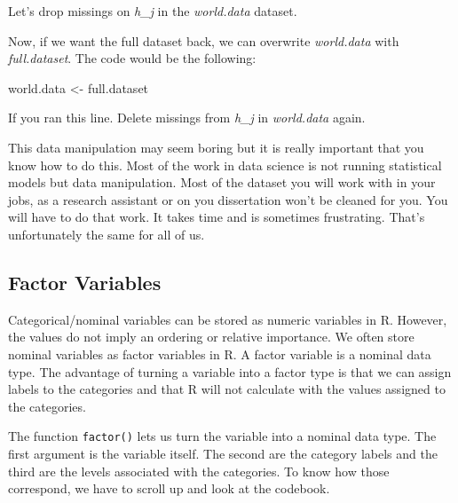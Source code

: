 \documentclass[]{book}
\newenvironment{Shaded}{\begin{snugshade}}{\end{snugshade}}
\newcommand{\KeywordTok}[1]{\textcolor[rgb]{0.13,0.29,0.53}{\textbf{#1}}}
\newcommand{\StringTok}[1]{\textcolor[rgb]{0.31,0.60,0.02}{#1}}
\newcommand{\OperatorTok}[1]{\textcolor[rgb]{0.81,0.36,0.00}{\textbf{#1}}}
\newcommand{\NormalTok}[1]{#1}
\theoremstyle{definition}
\theoremstyle{definition}
\theoremstyle{definition}
\theoremstyle{remark}
\begin{document}
Let's drop missings on \emph{h\_j} in the \emph{world.data} dataset.

\begin{Shaded}
\end{Shaded}

Now, if we want the full dataset back, we can overwrite
\emph{world.data} with \emph{full.dataset}. The code would be the
following:

\begin{Shaded}
\begin{Highlighting}[]
\NormalTok{world.data <-}\StringTok{ }\NormalTok{full.dataset}
\end{Highlighting}
\end{Shaded}

If you ran this line. Delete missings from \emph{h\_j} in
\emph{world.data} again.

This data manipulation may seem boring but it is really important that
you know how to do this. Most of the work in data science is not running
statistical models but data manipulation. Most of the dataset you will
work with in your jobs, as a research assistant or on you dissertation
won't be cleaned for you. You will have to do that work. It takes time
and is sometimes frustrating. That's unfortunately the same for all of
us.

\subsection{Factor Variables}\label{factor-variables}

Categorical/nominal variables can be stored as numeric variables in R.
However, the values do not imply an ordering or relative importance. We
often store nominal variables as factor variables in R. A factor
variable is a nominal data type. The advantage of turning a variable
into a factor type is that we can assign labels to the categories and
that R will not calculate with the values assigned to the categories.

The function \texttt{factor()} lets us turn the variable into a nominal
data type. The first argument is the variable itself. The second are the
category labels and the third are the levels associated with the
categories. To know how those correspond, we have to scroll up and look
at the codebook.
\end{document}
